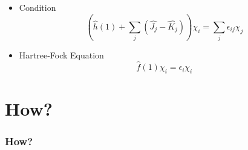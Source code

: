 \documentclass{beamer}
\begin{document}
\begin{frame}
    \begin{itemize}
        \item Condition
        \begin{equation*}
            \left(\hat{h}(1) + \sum_j(\hat{J_j} - \hat{K_j})\right)\chi_i = \sum_{j}\epsilon_{ij}\chi_j
        \end{equation*}
        \item Hartree-Fock Equation
        \begin{equation*}
            \hat{f}(1)\chi_i = \epsilon_i\chi_i
        \end{equation*}
    \end{itemize}
\end{frame}

\section{How?}
\label{sec:how}
\begin{frame}
    \frametitle{How?}
\end{frame}
\end{document}
